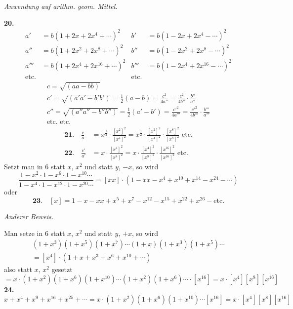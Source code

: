 \documentclass[10pt,a4paper]{article}
\begin{document}
\newpage
\textit{Anwendung auf arithm. geom. Mittel.}

\textbf{20.}
\begin{align*}
a' &= b(1 + 2x + 2x^4 + \cdots)^2 & b' &= b(1 - 2x + 2x^4 - \cdots)^2 \\
a'' &= b(1 + 2x^2 + 2x^8 + \cdots)^2 & b'' &= b(1 - 2x^2 + 2x^8 - \cdots)^2 \\
a''' &= b(1 + 2x^4 + 2x^{16} + \cdots)^2 & b''' &= b(1 - 2x^4 + 2x^{16} - \cdots)^2 \\
\text{etc.} && \text{etc.}
\end{align*}
%
\begin{gather*}
c = \sqrt{(aa - bb)} \\
c' = \sqrt{(a'a' - b'b')} = \tfrac{1}{2}(a - b) = \frac{c^2}{4a''} = \frac{c^2}{4b''} \cdot \frac{b''}{a''} \\
c'' = \sqrt{(a''a'' - b''b'')} = \tfrac{1}{2}(a' - b') = \frac{c'^2}{4a'''} = \frac{c'^2}{4b'''} \cdot \frac{b'''}{a'''} \\
\text{etc. \ \ etc.}
\end{gather*}
%
\begin{align*}
\textbf{21.} \quad \frac{c}{a} &= x^{\frac{1}{2}} \cdot \frac{[x^2]^2}{[x^4]^2} = x^{\frac{1}{2}} \cdot \frac{[x^2]^2}{[x^4]^2} \cdot \frac{[x^8]^2}{[x^8]^2} \text{ etc.} \\
\textbf{22.} \quad \frac{c'}{a'} &= x \cdot \frac{[x^4]^2}{[x^8]^2} = x \cdot \frac{[x^4]^2}{[x^8]^2} \cdot \frac{[x^{16}]^2}{[x^{16}]^2} \text{ etc.}
\end{align*}
%
Setzt man in 6 statt $x$, $x^2$ und statt $y$, $-x$, so wird
%
\begin{equation*}
\frac{1 - x^2 \cdot 1 - x^6 \cdot 1 - x^{10} \cdots}{1 - x^4 \cdot 1 - x^{12} \cdot 1 - x^{20} \cdots} =
[xx] \cdot (1 - xx - x^4 + x^{10} + x^{14} - x^{24} - \cdots)
\end{equation*}
%
oder
%
\begin{equation*}
\textbf{23.} \quad [x] = 1 - x - xx + x^5 + x^7 - x^{12} - x^{15} + x^{22} + x^{26} - \text{etc.}
\end{equation*}

\textit{Anderer Beweis.}

Man setze in 6 statt $x$, $x^2$ und statt $y$, $+x$, so wird
%
\begin{multline*}
(1 + x^3)(1 + x^5)(1 + x^7) \cdots (1 + x)(1 + x^3)(1 + x^5) \cdots \\
= [x^4] \cdot (1 + x + x^3 + x^6 + x^{10} + \cdots)
\end{multline*}
%
also statt $x$, $x^2$ gesetzt
%
\begin{equation*}
= x \cdot (1 + x^2)(1 + x^6)(1 + x^{10}) \cdots (1 + x^2)(1 + x^6) \cdots \cdot [x^{16}] = x \cdot [x^4][x^8][x^{16}]
\end{equation*}
%
\textbf{24.}
\begin{equation*}
x + x^4 + x^9 + x^{16} + x^{25} + \cdots = x \cdot (1 + x^2)(1 + x^6)(1 + x^{10}) \cdots [x^{16}] = x \cdot [x^4][x^8][x^{16}]
\end{equation*}
\end{document}
